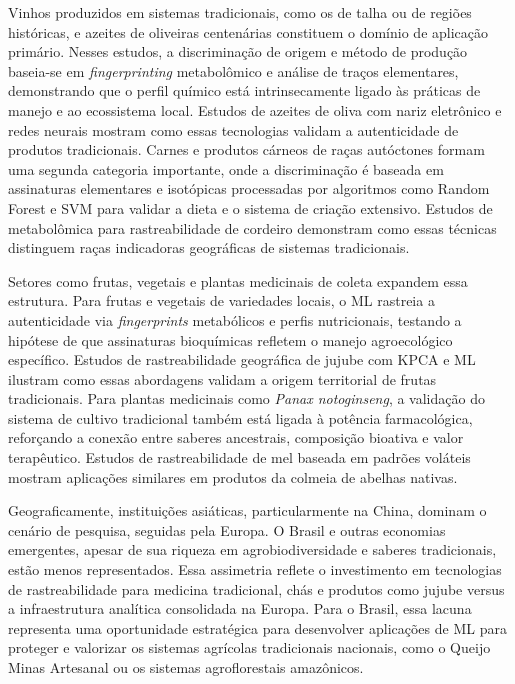 Vinhos produzidos em sistemas tradicionais, como os de talha ou de regiões históricas, e azeites de oliveiras centenárias constituem o domínio de aplicação primário. Nesses estudos, a discriminação de origem e método de produção baseia-se em \emph{fingerprinting} metabolômico e análise de traços elementares, demonstrando que o perfil químico está intrinsecamente ligado às práticas de manejo e ao ecossistema local. Estudos de azeites de oliva com nariz eletrônico e redes neurais mostram como essas tecnologias validam a autenticidade de produtos tradicionais. Carnes e produtos cárneos de raças autóctones formam uma segunda categoria importante, onde a discriminação é baseada em assinaturas elementares e isotópicas processadas por algoritmos como Random Forest e SVM para validar a dieta e o sistema de criação extensivo. Estudos de metabolômica para rastreabilidade de cordeiro demonstram como essas técnicas distinguem raças indicadoras geográficas de sistemas tradicionais.

Setores como frutas, vegetais e plantas medicinais de coleta expandem essa estrutura. Para frutas e vegetais de variedades locais, o ML rastreia a autenticidade via \emph{fingerprints} metabólicos e perfis nutricionais, testando a hipótese de que assinaturas bioquímicas refletem o manejo agroecológico específico. Estudos de rastreabilidade geográfica de jujube com KPCA e ML ilustram como essas abordagens validam a origem territorial de frutas tradicionais. Para plantas medicinais como \emph{Panax notoginseng}, a validação do sistema de cultivo tradicional também está ligada à potência farmacológica, reforçando a conexão entre saberes ancestrais, composição bioativa e valor terapêutico. Estudos de rastreabilidade de mel baseada em padrões voláteis mostram aplicações similares em produtos da colmeia de abelhas nativas.

Geograficamente, instituições asiáticas, particularmente na China, dominam o cenário de pesquisa, seguidas pela Europa. O Brasil e outras economias emergentes, apesar de sua riqueza em agrobiodiversidade e saberes tradicionais, estão menos representados. Essa assimetria reflete o investimento em tecnologias de rastreabilidade para medicina tradicional, chás e produtos como jujube versus a infraestrutura analítica consolidada na Europa. Para o Brasil, essa lacuna representa uma oportunidade estratégica para desenvolver aplicações de ML para proteger e valorizar os sistemas agrícolas tradicionais nacionais, como o Queijo Minas Artesanal ou os sistemas agroflorestais amazônicos.


